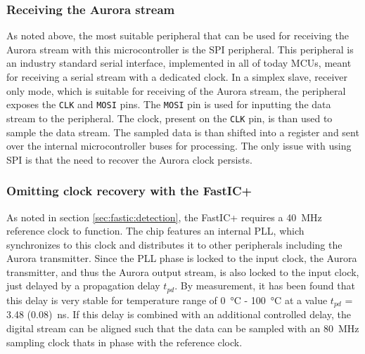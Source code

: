 \subsubsection{Receiving the Aurora stream}
As noted above, the most suitable peripheral that can be used for receiving the Aurora stream with this microcontroller is the SPI peripheral. This peripheral is an industry standard serial interface, implemented in all of today MCUs, meant for receiving a serial stream with a dedicated clock. In a simplex slave, receiver only mode, which is suitable for receiving of the Aurora stream, the peripheral exposes the \verb|CLK| and \verb|MOSI| pins. The \verb|MOSI| pin is used for inputting the data stream to the peripheral. The clock, present on the \verb|CLK| pin, is than used to sample the data stream. The sampled data is than shifted into a register and sent over the internal microcontroller buses for processing. The only issue with using SPI is that the need to recover the Aurora clock persists.

\subsubsection{Omitting clock recovery with the FastIC+}
As noted in section \ref{sec:fastic:detection}, the FastIC+ requires a \SI{40}{\mega\hertz} reference clock to function. The chip features an internal PLL, which synchronizes to this clock and distributes it to other peripherals including the Aurora transmitter. Since the PLL phase is locked to the input clock, the Aurora transmitter, and thus the Aurora output stream, is also locked to the input clock, just delayed by a propagation delay $t_{pd}$. By measurement, it has been found that this delay is very stable for temperature range of \SI{0}{\celsius} - \SI{100}{\celsius} at a value $t_{pd}$ = \SI{3.48 (0.08)}{\nano\second}. If this delay is combined with an additional controlled delay, the digital stream can be aligned such that the data can be sampled with an \SI{80}{\mega\hertz} sampling clock thats in phase with the reference clock. 

